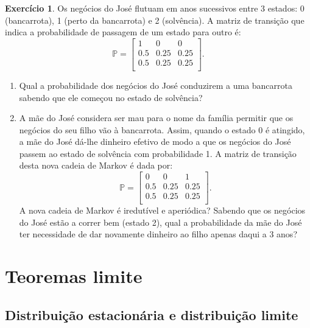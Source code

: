 \documentclass[
  11pt,
  a4paper,
]{book}
\theoremstyle{definition}
\theoremstyle{definition}
\theoremstyle{definition}
\newtheorem{exercise}{Exercício}[chapter]
\theoremstyle{definition}
\theoremstyle{remark}
\begin{document}
\begin{exercise}

Os negócios do José flutuam em anos sucessivos entre 3 estados: 0 (bancarrota), 1 (perto da bancarrota) e 2 (solvência). A matriz de transição que indica a probabilidade de passagem de um estado para outro é:
\[
\mathbb{P} =
\begin{bmatrix}
1 & 0 & 0   \\
0.5 & 0.25 & 0.25  \\
0.5 & 0.25 & 0.25 \\
\end{bmatrix}.
\]

\begin{enumerate}
\def\labelenumi{(\alph{enumi})}
\item
  Qual a probabilidade dos negócios do José conduzirem a uma bancarrota sabendo que ele começou no estado de solvência?
\item
  A mãe do José considera ser mau para o nome da família permitir que os negócios do seu filho vão à bancarrota. Assim, quando o estado 0 é atingido, a mãe do José dá-lhe dinheiro efetivo de modo a que os negócios do José passem ao estado de solvência com probabilidade 1. A matriz de transição desta nova cadeia de Markov é dada por:
  \[
  \mathbb{P} =
  \begin{bmatrix}
  0 & 0 & 1   \\
  0.5 & 0.25 & 0.25  \\
  0.5 & 0.25 & 0.25 \\
  \end{bmatrix}.
  \]
  A nova cadeia de Markov é iredutível e aperiódica? Sabendo que os negócios do José estão a correr bem (estado 2), qual a probabilidade da mãe do José ter necessidade de dar novamente dinheiro ao filho apenas daqui a 3 anos?
\end{enumerate}

\end{exercise}

\section{Teoremas limite}\label{teoremas-limite}

\subsection{Distribuição estacionária e distribuição limite}\label{distribuicao-estacionaria-e-distribuicao-limite}
\end{document}
